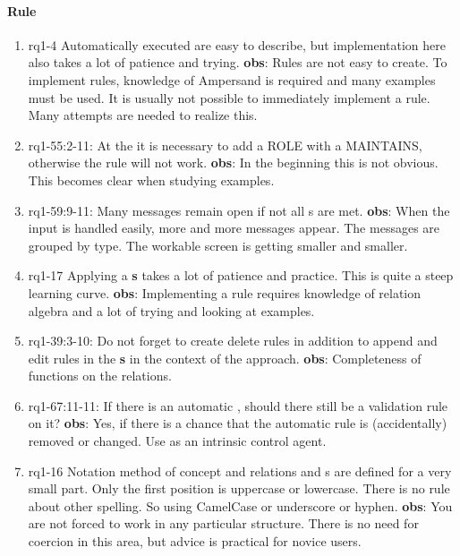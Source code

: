 \paragraph{Rule}
\begin{enumerate}
    \item rq1-4 Automatically executed  are easy to describe, but implementation here also takes a lot of patience and trying.
    \newline\textbf{obs}: Rules are not easy to create.
    To implement rules, knowledge of Ampersand is required and many examples must be used.
    It is usually not possible to immediately implement a rule.
    Many attempts are needed to realize this.

    \item rq1-55:2-11: At the  it is necessary to add a ROLE with a MAINTAINS, otherwise the rule will not work.
    \newline\textbf{obs}: In the beginning this is not obvious.
    This becomes clear when studying examples.

    \item rq1-59:9-11: Many messages remain open if not all s are met.
    \newline\textbf{obs}: When the input is handled easily, more and more messages appear.
    The messages are grouped by type.
    The workable screen is getting smaller and smaller.    

    \item rq1-17 Applying a \textbf{s} takes a lot of patience and practice.
    This is quite a steep learning curve.
    \newline\textbf{obs}: Implementing a rule requires knowledge of relation algebra and a lot of trying and looking at examples.

    \item rq1-39:3-10: Do not forget to create delete rules in addition to append and edit rules in the \textbf{s} in the context of the  approach.
    \newline\textbf{obs}: Completeness of functions on the relations.

    \item rq1-67:11-11: If there is an automatic , should there still be a validation rule on it?
    \newline\textbf{obs}: Yes, if there is a chance that the automatic rule is (accidentally) removed or changed.
    Use as an intrinsic control agent.

    \item rq1-16 Notation method of {concept} and {relation}s and s are defined for a very small part.
    Only the first position is uppercase or lowercase.
    There is no rule about other spelling.
    So using CamelCase or underscore or hyphen.
    \newline\textbf{obs}: You are not forced to work in any particular structure.
    There is no need for coercion in this area, but advice is practical for novice users.
    

\end{enumerate}

